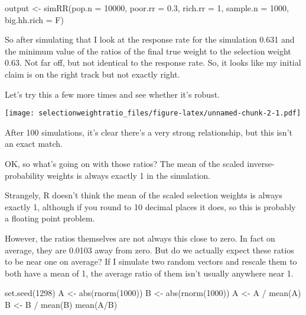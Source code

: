 \documentclass[
]{article}
\newenvironment{Shaded}{\begin{snugshade}}{\end{snugshade}}
\newcommand{\AttributeTok}[1]{\textcolor[rgb]{0.77,0.63,0.00}{#1}}
\newcommand{\DecValTok}[1]{\textcolor[rgb]{0.00,0.00,0.81}{#1}}
\newcommand{\FloatTok}[1]{\textcolor[rgb]{0.00,0.00,0.81}{#1}}
\newcommand{\FunctionTok}[1]{\textcolor[rgb]{0.00,0.00,0.00}{#1}}
\newcommand{\NormalTok}[1]{#1}
\newcommand{\OtherTok}[1]{\textcolor[rgb]{0.56,0.35,0.01}{#1}}
\newcommand{\SpecialCharTok}[1]{\textcolor[rgb]{0.00,0.00,0.00}{#1}}
\begin{document}
\begin{Shaded}
\begin{Highlighting}[]
\NormalTok{output }\OtherTok{\textless{}{-}} \FunctionTok{simRR}\NormalTok{(}\AttributeTok{pop.n =} \DecValTok{10000}\NormalTok{, }\AttributeTok{poor.rr =} \FloatTok{0.3}\NormalTok{, }\AttributeTok{rich.rr =} \DecValTok{1}\NormalTok{, }\AttributeTok{sample.n =} \DecValTok{1000}\NormalTok{, }\AttributeTok{big.hh.rich =}\NormalTok{ F)}
\end{Highlighting}
\end{Shaded}

So after simulating that I look at the response rate for the simulation
0.631 and the minimum value of the ratios of the final true weight to
the selection weight 0.63. Not far off, but not identical to the
response rate. So, it looks like my initial claim is on the right track
but not exactly right.

Let's try this a few more times and see whether it's robust.

\texttt{[image: selectionweightratio\_files/figure-latex/unnamed-chunk-2-1.pdf]}

After 100 simulations, it's clear there's a very strong relationship,
but this isn't an exact match.

OK, so what's going on with those ratios? The mean of the scaled
inverse-probability weights is always exactly 1 in the simulation.

Strangely, R doesn't think the mean of the scaled selection weights is
always exactly 1, although if you round to 10 decimal places it does, so
this is probably a floating point problem.

However, the ratios themselves are not always this close to zero. In
fact on average, they are 0.0103 away from zero. But do we actually
expect these ratios to be near one on average? If I simulate two random
vectors and rescale them to both have a mean of 1, the average ratio of
them isn't usually anywhere near 1.

\begin{Shaded}
\begin{Highlighting}[]
\FunctionTok{set.seed}\NormalTok{(}\DecValTok{1298}\NormalTok{)}
\NormalTok{A }\OtherTok{\textless{}{-}} \FunctionTok{abs}\NormalTok{(}\FunctionTok{rnorm}\NormalTok{(}\DecValTok{1000}\NormalTok{))}
\NormalTok{B }\OtherTok{\textless{}{-}} \FunctionTok{abs}\NormalTok{(}\FunctionTok{rnorm}\NormalTok{(}\DecValTok{1000}\NormalTok{))}
\NormalTok{A }\OtherTok{\textless{}{-}}\NormalTok{ A }\SpecialCharTok{/} \FunctionTok{mean}\NormalTok{(A)}
\NormalTok{B }\OtherTok{\textless{}{-}}\NormalTok{ B }\SpecialCharTok{/} \FunctionTok{mean}\NormalTok{(B)}
\FunctionTok{mean}\NormalTok{(A}\SpecialCharTok{/}\NormalTok{B)}
\end{Highlighting}
\end{Shaded}
\end{document}
